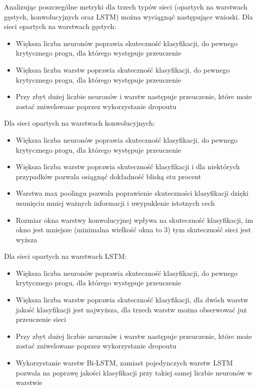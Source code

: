Analizując poszczególne metryki dla trzech typów sieci (opartych na warstwach gęstych, konwolucyjnych oraz LSTM) można wyciągnąć następujące wnioski.  \hfill \break \hfill \break
\noindent Dla sieci opartych na warstwach gęstych: 
\begin{itemize}
    \item Większa liczba neuronów poprawia skuteczność klasyfikacji, do pewnego krytycznego progu, dla którego występuje przeuczenie
    \item Większa liczba warstw poprawia skuteczność klasyfikacji, do pewnego krytycznego progu, dla którego występuje przeuczenie
    \item Przy zbyt dużej liczbie neuronów i warstw następuje przeuczenie, które może zostać zniwelowane poprzez wykorzystanie dropoutu
\end{itemize}

 
\noindent Dla sieci opartych na warstwach konwolucyjnych: 

\begin{itemize}
    \item Większa liczba neuronów poprawia skuteczność klasyfikacji, do pewnego krytycznego progu, dla którego występuje przeuczenie
    \item Większa liczba warstw poprawia skuteczność klasyfikacji i dla niektórych przypadków pozwala osiągnąć dokładność bliską stu procent
    \item Warstwa max poolingu pozwala poprawienie skuteczności klasyfikacji dzięki usunięciu mniej ważnych informacji i uwypuklenie istotnych cech
    \item Rozmiar okna warstwy konwolucyjnej wpływa na skuteczność klasyfikacji, im okno jest mniejsze (minimalna wielkość okna to 3) tym skuteczność sieci jest wyższa
\end{itemize}

\noindent Dla sieci opartych na warstwach LSTM: 
\begin{itemize}
    \item Większa liczba neuronów poprawia skuteczność klasyfikacji, do pewnego krytycznego progu, dla którego występuje przeuczenie
    \item Większa liczba warstw poprawia skuteczność klasyfikacji, dla dwóch warstw jakość klasyfikacji jest najwyższa, dla trzech warstw można obserwować już przeuczenie sieci
    \item Przy zbyt dużej liczbie neuronów i warstw następuje przeuczenie, które może zostać zniwelowane poprzez wykorzystanie dropoutu
    \item Wykorzystanie warstw Bi-LSTM, zamiast pojedynczych warstw LSTM pozwala na poprawę jakości klasyfikacji przy takiej samej liczbie neuronów w warstwie
\end{itemize}

